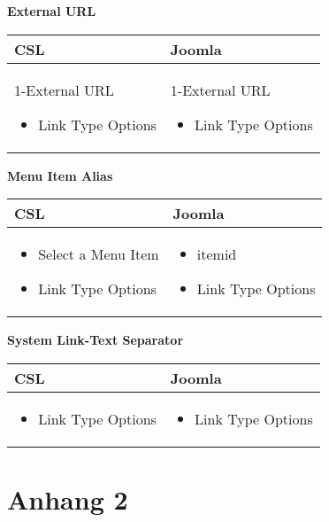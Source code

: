 \textbf{External URL}

\begin{minipage}{0.7\textwidth}
\begin{tabular}{|p{} | p{}|}
\hline
\textbf{CSL} & \textbf{Joomla} \\ 
\hline
1-External URL
 \begin{itemize}
 \item Link Type Options
 \end{itemize}
 & 
1-External URL
\begin{itemize}
 \item Link Type Options
 \end{itemize}
\\
\hline
\end{tabular}
\end{minipage}

\textbf{Menu Item Alias}

\begin{minipage}{0.7\textwidth}
\begin{tabular}{|p{} | p{}|}
\hline
\textbf{CSL} & \textbf{Joomla} \\ 
\hline

 \begin{itemize}
 \item Select a Menu Item
 \item Link Type Options
 \end{itemize}
 & 

\begin{itemize}
\item itemid
 \item Link Type Options
 \end{itemize}
\\
\hline
\end{tabular}
\end{minipage}

\textbf{System Link-Text Separator}

\begin{minipage}{0.7\textwidth}
\begin{tabular}{|p{} | p{}|}
\hline
\textbf{CSL} & \textbf{Joomla} \\ 
\hline

 \begin{itemize}
 \item Link Type Options
 \end{itemize}
 & 

\begin{itemize}
 \item Link Type Options
 \end{itemize}
\\
\hline
\end{tabular}
\end{minipage}

\chapter{Anhang 2}


